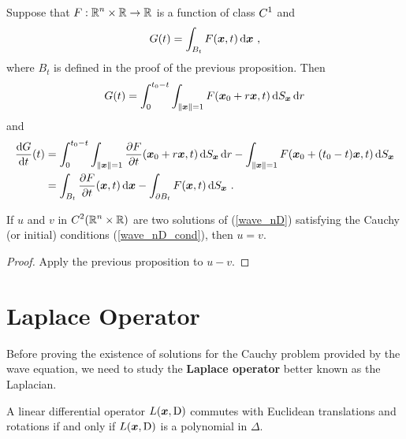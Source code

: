 \begin{rmk}
Suppose that $\displaystyle F:\mathbb{R}^n\times \mathbb{R}\rightarrow \mathbb{R}$ is a
function of class $\displaystyle C^1$ and
\[
G(t) = \int_{B_t} F({\bm{x}},t) \,\mathrm{d}{{\bm{x}}} \  ,
\]
where $B_t$ is defined in the proof of the previous proposition.  Then
\[
G(t) = \int_0^{t_0-t} \int_{\|{\bm{x}}\|=1} F({\bm{x}}_0+r{\bm{x}},t)
\,\mathrm{d}{S}_{{\bm{x}}} \,\mathrm{d}{r}
\]
and
\begin{align*}
\frac{\mathrm{d}G}{\mathrm{d}{t}}(t) &=
\int_0^{t_0-t} \int_{\|{\bm{x}}\|=1} \frac{\partial{F}}{\partial t}({\bm{x}}_0+r{\bm{x}},t)
\,\mathrm{d}{S}_{{\bm{x}}} \,\mathrm{d}{r} -
\int_{\|{\bm{x}}\|=1} F({\bm{x}}_0+(t_0-t){\bm{x}},t)
\,\mathrm{d}{S}_{{\bm{x}}} \\
&= \int_{B_t} \frac{\partial{F}}{\partial t}({\bm{x}},t) \,\mathrm{d}{{\bm{x}}} -
\int_{\partial B_t} F({\bm{x}},t) \,\mathrm{d}{S}_{{\bm{x}}} \ .
\end{align*}
\label{wave_nrgy}
\end{rmk}

\begin{cor}
If $u$ and $v$ in $\displaystyle C^2(\mathbb{R}^n\times \mathbb{R})$ are two solutions of
(\ref{wave_nD}) satisfying the Cauchy (or initial) conditions
(\ref{wave_nD_cond}), then $u=v$.
\end{cor}

\begin{proof}
Apply the previous proposition to $u-v$.
\end{proof}

\section{Laplace Operator} \label{SectWavenDLaplOp}

Before proving the existence of solutions for the Cauchy problem
provided by the wave equation, we need to study the
{\bfseries Laplace operator} better known as
the Laplacian.

\begin{theorem}
A linear differential operator $L({\bm{x}},\operatorname{D})$ commutes with Euclidean
translations and rotations if and only if $L({\bm{x}},\operatorname{D})$ is a
polynomial in $\Delta$.
\end{theorem}

